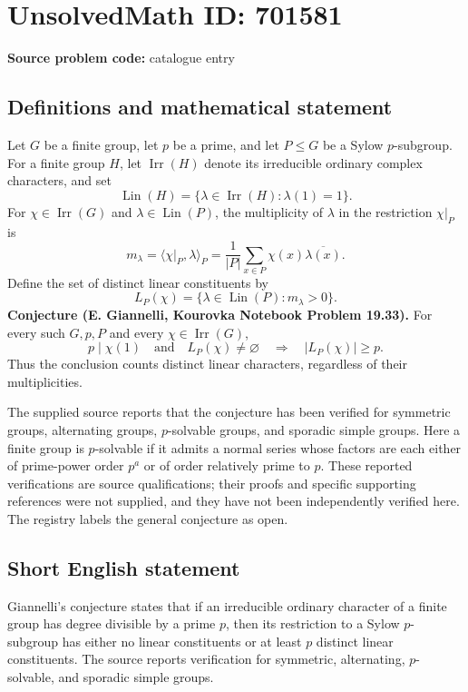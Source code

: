 \documentclass[11pt]{article}
\begin{document}
\section*{UnsolvedMath ID: 701581}
\textbf{Source problem code:} catalogue entry
\subsection{Definitions and mathematical statement}
Let \(G\) be a finite group, let \(p\) be a prime, and let \(P\leq G\) be a Sylow \(p\)-subgroup. For a finite group \(H\), let \(\operatorname{Irr}(H)\) denote its irreducible ordinary complex characters, and set
\[
\operatorname{Lin}(H)=\{\lambda\in\operatorname{Irr}(H):\lambda(1)=1\}.
\]
For \(\chi\in\operatorname{Irr}(G)\) and \(\lambda\in\operatorname{Lin}(P)\), the multiplicity of \(\lambda\) in the restriction \(\chi|_P\) is
\[
m_\lambda=\langle\chi|_P,\lambda\rangle_P
=\frac{1}{|P|}\sum_{x\in P}\chi(x)\overline{\lambda(x)}.
\]
Define the set of distinct linear constituents by
\[
L_P(\chi)=\{\lambda\in\operatorname{Lin}(P):m_\lambda>0\}.
\]
\textbf{Conjecture (E. Giannelli, Kourovka Notebook Problem 19.33).} For every such \(G,p,P\) and every \(\chi\in\operatorname{Irr}(G)\),
\[
p\mid\chi(1)\quad\text{and}\quad L_P(\chi)\ne\varnothing
\quad\Longrightarrow\quad |L_P(\chi)|\geq p.
\]
Thus the conclusion counts distinct linear characters, regardless of their multiplicities.

The supplied source reports that the conjecture has been verified for symmetric groups, alternating groups, \(p\)-solvable groups, and sporadic simple groups. Here a finite group is \(p\)-solvable if it admits a normal series whose factors are each either of prime-power order \(p^a\) or of order relatively prime to \(p\). These reported verifications are source qualifications; their proofs and specific supporting references were not supplied, and they have not been independently verified here. The registry labels the general conjecture as open.
\subsection{Short English statement}
Giannelli's conjecture states that if an irreducible ordinary character of a finite group has degree divisible by a prime \(p\), then its restriction to a Sylow \(p\)-subgroup has either no linear constituents or at least \(p\) distinct linear constituents. The source reports verification for symmetric, alternating, \(p\)-solvable, and sporadic simple groups.
\end{document}

